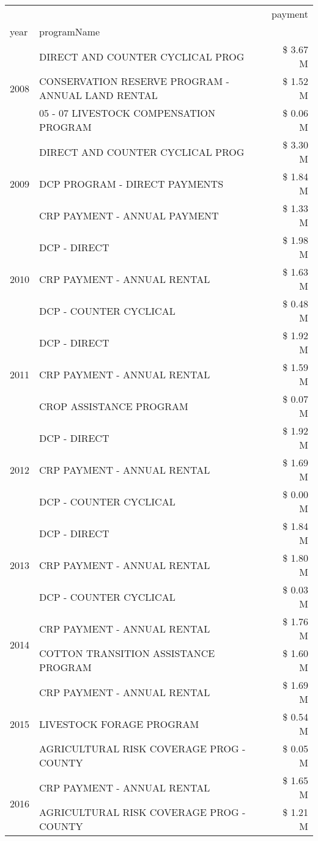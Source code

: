 \begin{tabular}{llr}
\toprule
 &  & payment \\
year & programName &  \\
\midrule
\multirow[t]{3}{*}{2008} & DIRECT AND COUNTER CYCLICAL PROG & \$ 3.67 M \\
 & CONSERVATION RESERVE PROGRAM - ANNUAL LAND RENTAL & \$ 1.52 M \\
 & 05 - 07 LIVESTOCK COMPENSATION PROGRAM & \$ 0.06 M \\
\cline{1-3}
\multirow[t]{3}{*}{2009} & DIRECT AND COUNTER CYCLICAL PROG & \$ 3.30 M \\
 & DCP PROGRAM - DIRECT PAYMENTS & \$ 1.84 M \\
 & CRP PAYMENT - ANNUAL PAYMENT & \$ 1.33 M \\
\cline{1-3}
\multirow[t]{3}{*}{2010} & DCP - DIRECT & \$ 1.98 M \\
 & CRP PAYMENT - ANNUAL RENTAL & \$ 1.63 M \\
 & DCP - COUNTER CYCLICAL & \$ 0.48 M \\
\cline{1-3}
\multirow[t]{3}{*}{2011} & DCP - DIRECT & \$ 1.92 M \\
 & CRP PAYMENT - ANNUAL RENTAL & \$ 1.59 M \\
 & CROP ASSISTANCE PROGRAM & \$ 0.07 M \\
\cline{1-3}
\multirow[t]{3}{*}{2012} & DCP - DIRECT & \$ 1.92 M \\
 & CRP PAYMENT - ANNUAL RENTAL & \$ 1.69 M \\
 & DCP - COUNTER CYCLICAL & \$ 0.00 M \\
\cline{1-3}
\multirow[t]{3}{*}{2013} & DCP - DIRECT & \$ 1.84 M \\
 & CRP PAYMENT - ANNUAL RENTAL & \$ 1.80 M \\
 & DCP - COUNTER CYCLICAL & \$ 0.03 M \\
\cline{1-3}
\multirow[t]{2}{*}{2014} & CRP PAYMENT - ANNUAL RENTAL & \$ 1.76 M \\
 & COTTON TRANSITION ASSISTANCE PROGRAM & \$ 1.60 M \\
\cline{1-3}
\multirow[t]{3}{*}{2015} & CRP PAYMENT - ANNUAL RENTAL & \$ 1.69 M \\
 & LIVESTOCK FORAGE PROGRAM & \$ 0.54 M \\
 & AGRICULTURAL RISK COVERAGE PROG - COUNTY & \$ 0.05 M \\
\cline{1-3}
\multirow[t]{3}{*}{2016} & CRP PAYMENT - ANNUAL RENTAL & \$ 1.65 M \\
 & AGRICULTURAL RISK COVERAGE PROG - COUNTY & \$ 1.21 M \\

\end{tabular}
